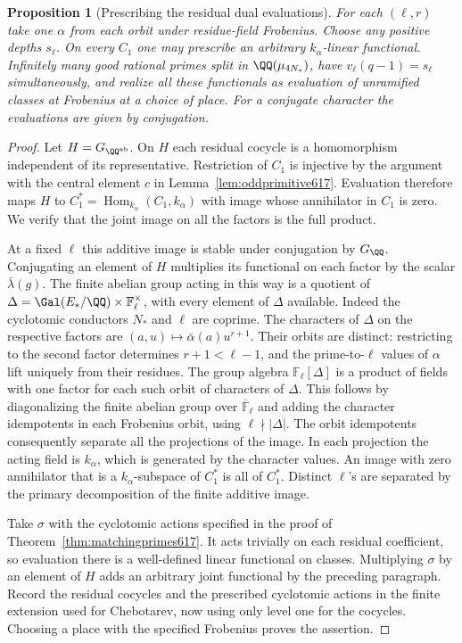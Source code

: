 \documentclass[a4paper,11pt]{article}
\newtheorem{proposition}{Proposition}[section]
\theoremstyle{definition}
\theoremstyle{remark}
\numberwithin{equation}{section}
\begin{document}
\begin{proposition}[Prescribing the residual dual evaluations]
\label{prop:oddrows618}
For each \((\ell,r)\) take one \(\alpha\) from each orbit under
residue-field Frobenius. Choose any positive depths \(s_\ell\).
On every \(C_1\) one may prescribe an arbitrary
\(k_\alpha\)-linear functional. Infinitely many good rational primes
split in \(\QQ(\mu_{4N_*})\), have \(v_\ell(q-1)=s_\ell\)
simultaneously, and realize all these functionals as evaluation
of unramified classes at Frobenius at a choice of place. For a
conjugate character the evaluations are given by conjugation.
\end{proposition}
\begin{proof}
Let \(H=G_{\QQ^{\rm ab}}\). On \(H\) each residual cocycle is a
homomorphism independent of its representative. Restriction of
\(C_1\) is injective by the argument with the central element \(c\)
in Lemma~\ref{lem:oddprimitive617}. Evaluation therefore maps \(H\)
to \(C_1^*=\operatorname{Hom}_{k_\alpha}(C_1,k_\alpha)\) with image
whose annihilator in \(C_1\) is zero. We verify that the joint
image on all the factors is the full product.

At a fixed \(\ell\) this additive image is stable under conjugation
by \(G_\QQ\). Conjugating an element of \(H\) multiplies its
functional on each factor by the scalar \(\bar\lambda(g)\).
The finite abelian group acting in this way is a quotient of
\(\Delta=\Gal(E_*/\QQ)\times\mathbb F_\ell^\times\), with every
element of \(\Delta\) available. Indeed the cyclotomic conductors
\(N_*\) and \(\ell\) are coprime. The characters of \(\Delta\)
on the respective factors are \((a,u)\mapsto\bar\alpha(a)u^{r+1}\).
Their orbits are distinct: restricting to the second factor
determines \(r+1<\ell-1\), and the prime-to-\(\ell\) values of
\(\alpha\) lift uniquely from their residues. The group algebra
\(\mathbb F_\ell[\Delta]\) is a product of fields with one factor
for each such orbit of characters of \(\Delta\). This follows by
diagonalizing the finite abelian group over
\(\overline{\mathbb F}_\ell\) and adding the character idempotents
in each Frobenius orbit, using \(\ell\nmid|\Delta|\).
The orbit idempotents consequently separate all the projections
of the image. In each projection the acting field is \(k_\alpha\),
which is generated by the character values. An image with zero
annihilator that is a \(k_\alpha\)-subspace of \(C_1^*\) is all
of \(C_1^*\). Distinct \(\ell\)'s are separated by the primary
decomposition of the finite additive image.

Take \(\sigma\) with the cyclotomic actions specified in the proof
of Theorem~\ref{thm:matchingprimes617}. It acts trivially on each
residual coefficient, so evaluation there is a well-defined linear
functional on classes. Multiplying \(\sigma\) by an element of \(H\)
adds an arbitrary joint functional by the preceding paragraph.
Record the residual cocycles and the prescribed cyclotomic actions
in the finite extension used for Chebotarev, now using only level
one for the cocycles. Choosing a place with the specified Frobenius
proves the assertion.
\end{proof}
\end{document}
